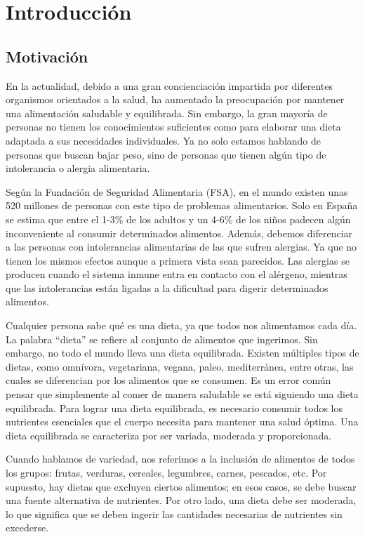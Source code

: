 \chapter{Introducción}

\section{Motivación}
En la actualidad, debido a una gran concienciación impartida por diferentes organismos orientados a la salud, ha aumentado la preocupación por mantener una alimentación saludable y equilibrada. Sin embargo, la gran mayoría de personas no tienen los conocimientos suficientes como para elaborar una dieta adaptada a sus necesidades individuales. Ya no solo estamos hablando de personas que buscan bajar peso, sino de personas que tienen algún tipo de intolerancia o alergia alimentaria.

Según la Fundación de Seguridad Alimentaria (FSA), en el mundo existen unas 520 millones de personas con este tipo de problemas alimentarios. Solo en España se estima que entre el 1-3\% de los adultos y un 4-6\% de los niños padecen algún inconveniente al consumir determinados alimentos. Además, debemos diferenciar a las personas con intolerancias alimentarias de las que sufren alergias. Ya que no tienen los mismos efectos aunque a primera vista sean parecidos. Las alergias se producen cuando el sistema inmune entra en contacto con el alérgeno, mientras que las intolerancias están ligadas a la dificultad para digerir determinados alimentos.\cite{FSA}

Cualquier persona sabe qué es una dieta, ya que todos nos alimentamos cada día. La palabra ``dieta'' se refiere al conjunto de alimentos que ingerimos. Sin embargo, no todo el mundo lleva una dieta equilibrada. Existen múltiples tipos de dietas, como omnívora, vegetariana, vegana, paleo, mediterránea, entre otras, las cuales se diferencian por los alimentos que se consumen.
Es un error común pensar que simplemente al comer de manera saludable se está siguiendo una dieta equilibrada. Para lograr una dieta equilibrada, es necesario consumir todos los nutrientes esenciales que el cuerpo necesita para mantener una salud óptima. Una dieta equilibrada se caracteriza por ser variada, moderada y proporcionada.

Cuando hablamos de variedad, nos referimos a la inclusión de alimentos de todos los grupos: frutas, verduras, cereales, legumbres, carnes, pescados, etc. Por supuesto, hay dietas que excluyen ciertos alimentos; en esos casos, se debe buscar una fuente alternativa de nutrientes. Por otro lado, una dieta debe ser moderada, lo que significa que se deben ingerir las cantidades necesarias de nutrientes sin excederse.

